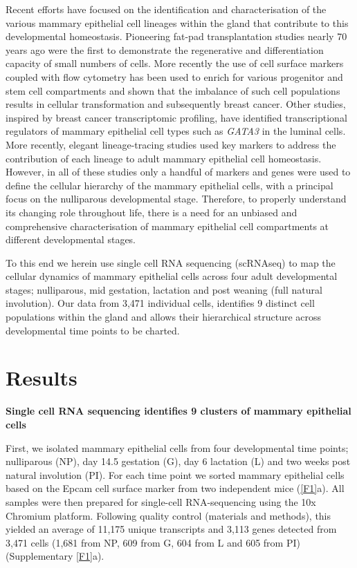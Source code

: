 \documentclass[titlepage, 12pt, oneside]{amsart}
\begin{document}
Recent efforts have focused on the identification and characterisation of the various mammary epithelial cell lineages within the gland that contribute to this developmental homeostasis.
Pioneering fat-pad transplantation studies nearly 70 years ago were the first to demonstrate the regenerative and differentiation capacity of small numbers of cells\autocite{Faulkin1960,Daniel197,Smalley1998}.
More recently the use of cell surface markers coupled with flow cytometry has been used to enrich for various progenitor and stem cell compartments\autocite{Smalley1998,Stingl2006,Shackleton2006,Asselin2007} and shown that the imbalance of such cell populations results in cellular transformation and subsequently breast cancer\autocite{Lim2009,Molyneux2010}.
Other studies, inspired by breast cancer transcriptomic profiling, have identified transcriptional regulators of mammary epithelial cell types such as \textit{GATA3} in the luminal cells\autocite{Asselin2007,Kouros2006}.
More recently, elegant lineage-tracing studies used key markers to address the contribution of each lineage to adult mammary epithelial cell homeostasis\autocite{Inman2015}.
However, in all of these studies only a handful of markers and genes were used to define the cellular hierarchy of the mammary epithelial cells, with a principal focus on the nulliparous developmental stage.
Therefore, to properly understand its changing role throughout life, there is a need for an unbiased and comprehensive characterisation of mammary epithelial cell compartments at different developmental stages.

To this end we herein use single cell RNA sequencing (scRNAseq) to map the cellular dynamics of mammary epithelial cells across four adult developmental stages; nulliparous, mid gestation, lactation and post weaning (full natural involution).
Our data from 3,471 individual cells, identifies 9 distinct cell populations within the gland and allows their hierarchical structure across developmental time points to be charted.

\section{Results}

\textbf{Single cell RNA sequencing identifies 9 clusters of mammary epithelial cells}

First, we isolated mammary epithelial cells from four developmental time points; nulliparous (NP), day 14.5 gestation (G), day 6 lactation (L) and two weeks post natural involution (PI).
For each time point we sorted mammary epithelial cells based on the Epcam cell surface marker from two independent mice (\autoref{F1}a).
All samples were then prepared for single-cell RNA-sequencing using the 10x Chromium platform\autocite{Zheng2017}.
Following quality control (materials and methods), this yielded an average of 11,175 unique transcripts and 3,113 genes detected from 3,471 cells (1,681 from NP, 609 from G, 604 from L and 605 from PI) (Supplementary \autoref{F1}a).
\end{document}
